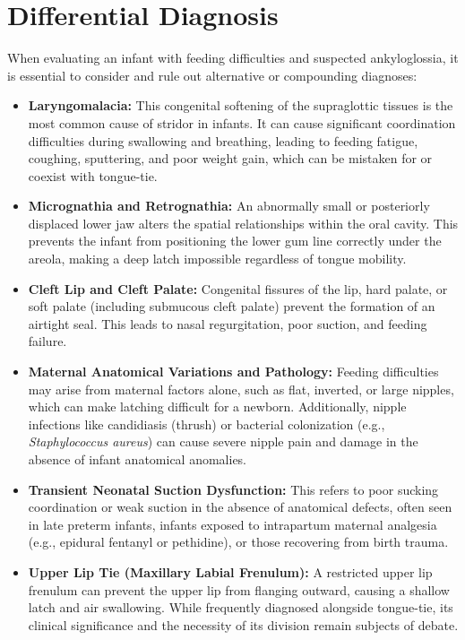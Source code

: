 \section*{Differential Diagnosis}
When evaluating an infant with feeding difficulties and suspected ankyloglossia, it is essential to consider and rule out alternative or compounding diagnoses:
\begin{itemize}
  \item \textbf{Laryngomalacia:} This congenital softening of the supraglottic tissues is the most common cause of stridor in infants. It can cause significant coordination difficulties during swallowing and breathing, leading to feeding fatigue, coughing, sputtering, and poor weight gain, which can be mistaken for or coexist with tongue-tie.
  \item \textbf{Micrognathia and Retrognathia:} An abnormally small or posteriorly displaced lower jaw alters the spatial relationships within the oral cavity. This prevents the infant from positioning the lower gum line correctly under the areola, making a deep latch impossible regardless of tongue mobility.
  \item \textbf{Cleft Lip and Cleft Palate:} Congenital fissures of the lip, hard palate, or soft palate (including submucous cleft palate) prevent the formation of an airtight seal. This leads to nasal regurgitation, poor suction, and feeding failure.
  \item \textbf{Maternal Anatomical Variations and Pathology:} Feeding difficulties may arise from maternal factors alone, such as flat, inverted, or large nipples, which can make latching difficult for a newborn. Additionally, nipple infections like candidiasis (thrush) or bacterial colonization (e.g., \textit{Staphylococcus aureus}) can cause severe nipple pain and damage in the absence of infant anatomical anomalies.
  \item \textbf{Transient Neonatal Suction Dysfunction:} This refers to poor sucking coordination or weak suction in the absence of anatomical defects, often seen in late preterm infants, infants exposed to intrapartum maternal analgesia (e.g., epidural fentanyl or pethidine), or those recovering from birth trauma.
  \item \textbf{Upper Lip Tie (Maxillary Labial Frenulum):} A restricted upper lip frenulum can prevent the upper lip from flanging outward, causing a shallow latch and air swallowing. While frequently diagnosed alongside tongue-tie, its clinical significance and the necessity of its division remain subjects of debate.
\end{itemize}

